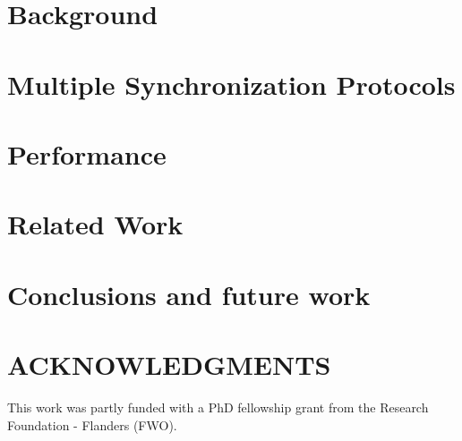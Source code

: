 \documentclass{scs}
\begin{document}
\section{Background}
\label{sec:2-background}


\section{Multiple Synchronization Protocols}
\label{sec:3-features}


\section{Performance}
\label{sec:4-performance}


\section{Related Work}
\label{sec:5-related-work}


\section{Conclusions and future work}
\label{sec:6-conclusion}


\section*{ACKNOWLEDGMENTS}
This work was partly funded with a PhD fellowship grant from the Research Foundation - Flanders (FWO). 



\end{document}
